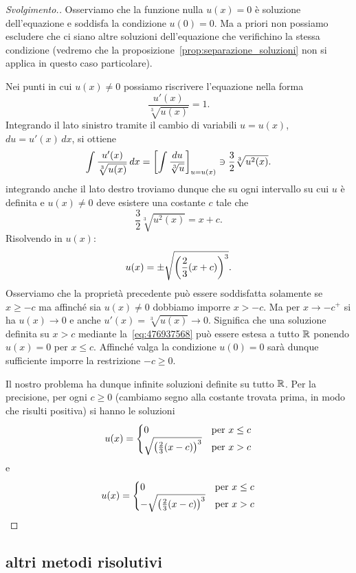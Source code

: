 \begin{proof}[Svolgimento.]
Osserviamo che la funzione nulla $u(x)=0$ è soluzione dell'equazione
e soddisfa la condizione $u(0)=0$.
Ma a priori non possiamo escludere che ci siano altre soluzioni dell'equazione
che verifichino la stessa condizione (vedremo che la
proposizione~\ref{prop:separazione_soluzioni} non si applica in questo caso
particolare).

Nei punti in cui $u(x)\neq 0$ possiamo riscrivere l'equazione nella forma
\[
  \frac{u'(x)}{\sqrt[3]{u(x)}} = 1.
\]
Integrando il lato sinistro tramite il cambio di variabili $u=u(x)$,
$du = u'(x)\, dx$,
si ottiene
\[
  \int \frac{u'(x)}{\sqrt[3]{u(x)}}\, dx
  = {\left[ \int \frac{du}{\sqrt[3]u} \right]}_{u=u(x)}
  \ni \frac 3 2 \sqrt[3]{u^2(x)}.
\]
integrando anche il lato destro troviamo dunque
che su ogni intervallo su cui $u$ è definita e $u(x)\neq 0$
deve esistere una costante $c$ tale che
\[
  \frac 3 2 \sqrt[3]{u^2(x)} = x + c.
\]
Risolvendo in $u(x)$:
\begin{equation}\label{eq:476937568}
  u(x) = \pm \sqrt{{\left( \frac 2 3 (x+c) \right)}^3}.
\end{equation}
Osserviamo che la proprietà precedente
può essere soddisfatta solamente se $x\ge -c$ ma affinché
sia $u(x)\neq 0$ dobbiamo imporre $x>-c$.
Ma per $x\to -c^+$
si ha $u(x)\to 0$ e anche $u'(x) = \sqrt[3]{u(x)}\to 0$.
Significa che una soluzione definita su $x>c$ mediante
la~\eqref{eq:476937568} può essere estesa a tutto ${\mathbb R}$
ponendo $u(x)=0$ per $x\le c$.
Affinché valga la condizione $u(0)=0$ sarà dunque sufficiente
imporre la restrizione $-c\ge 0$.

Il nostro problema ha dunque infinite soluzioni definite
su tutto ${\mathbb R}$. Per la precisione, per ogni $c\ge 0$
(cambiamo segno alla costante trovata prima, in modo che risulti
positiva)
si hanno le soluzioni
\[
  u(x) = \begin{cases}
    0 & \text{per $x\le c$}\\
    \sqrt{{\left( \frac 2 3 (x-c) \right)}^3} & \text{per $x>c$}
  \end{cases}
\]
e
\[
  u(x) = \begin{cases}
    0 & \text{per $x\le c$}\\
    -\sqrt{{\left( \frac 2 3 (x-c) \right)}^3} & \text{per $x>c$}
  \end{cases}
\]
\end{proof}
\subsection{altri metodi risolutivi}

